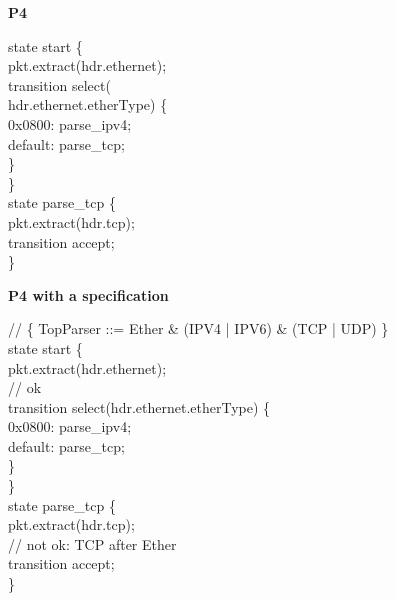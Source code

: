 \documentclass[a4paper,UKenglish,cleveref,autoref]{lipics-v2021}
\begin{document}
\noindent
\begin{minipage}[t]{0.34\textwidth}
\raggedright
{\footnotesize\bfseries P4}\\[0.35em]
{\scriptsize\ttfamily
state start \{\\
\hspace*{1em}pkt.extract(hdr.ethernet);\\
\hspace*{1em}transition select(\\
\hspace*{2em}hdr.ethernet.etherType) \{\\
\hspace*{2em}0x0800: parse\_ipv4;\\
\hspace*{2em}default: parse\_tcp;\\
\hspace*{1em}\}\\
\}\\[0.25em]
state parse\_tcp \{\\
\hspace*{1em}pkt.extract(hdr.tcp);\\
\hspace*{1em}transition accept;\\
\}\par}
\end{minipage}%
\hspace{0.4em}\vrule\hspace{0.45em}%
\begin{minipage}[t]{0.62\textwidth}
\raggedright
{\footnotesize\bfseries P4 with a specification}\\[0.35em]
{\scriptsize\ttfamily
// \{ TopParser ::= Ether \& (IPV4 | IPV6) \& (TCP | UDP) \}\\
state start \{\\
\hspace*{1em}pkt.extract(hdr.ethernet);\\
\hspace*{1em}// ok\\
\hspace*{1em}transition select(hdr.ethernet.etherType) \{\\
\hspace*{2em}0x0800: parse\_ipv4;\\
\hspace*{2em}default: parse\_tcp;\\
\hspace*{1em}\}\\
\}\\[0.25em]
state parse\_tcp \{\\
\hspace*{1em}pkt.extract(hdr.tcp);\\
\hspace*{1em}// not ok: TCP after Ether\\
\hspace*{1em}transition accept;\\
\}\par}
\end{minipage}
\end{document}
